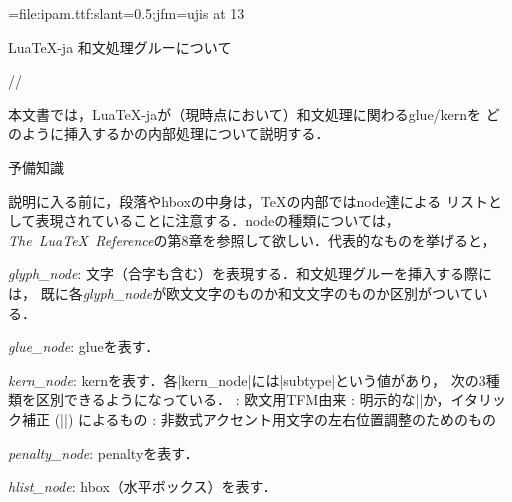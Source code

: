 \newcount\ncount
\def\node#1{
  \ifnum\ncount=0 \ncount=1\else\longrightarrow\fi
  \setbox0=\hbox{\kern.5em$\mathstrut#1$\kern.5em}\dp0=0pt
  \hbox{\vrule
    $\vcenter{\hsize=\wd0\hrule\kern.5ex\copy0\kern.5ex\hrule}$%
    \vrule\kern.1em}}
\def\nk{{\rm kern}\ }
\def\ng{{\rm glue}\ }
\def\np{{\rm penalty}\ }
\def\z{\,{\rm zw}}
\jfont\tenmini={file:ipam.ttf:slant=0.5;jfm=ujis} at 13\jQ

\centerline{\big Lua\TeX-ja 和文処理グルーについて}\bigskip
\centerline{\large\the\year/\the\month/\the\day}\medskip

本文書では，Lua\TeX-jaが（現時点において）和文処理に関わるglue/kernを
どのように挿入するかの内部処理について説明する．

\beginsection 予備知識

説明に入る前に，段落やhboxの中身は，\TeX の内部ではnode達による
リストとして表現されていることに注意する．nodeの種類については，
\hbox{\it The\ Lua\TeX\ Reference\/}の第8章を参照して欲しい．代表的なものを挙げると，

\item {\it glyph\_node}: 文字（合字も含む）を表現する．和文処理グルーを挿入する際には，
既に各{\it glyph\_node}が欧文文字のものか和文文字のものか区別がついている．
\item {\it glue\_node}: glueを表す．
\item {\it kern\_node}: kernを表す．各|kern_node|には|subtype|という値があり，
次の3種類を区別できるようになっている．
: 欧文用TFM由来
: 明示的な|\kern|か，イタリック補正 (|\/|) によるもの
: 非数式アクセント用文字の左右位置調整のためのもの
\item {\it penalty\_node}: penaltyを表す．
\item {\it hlist\_node}: hbox（水平ボックス）を表す．
\enditem

